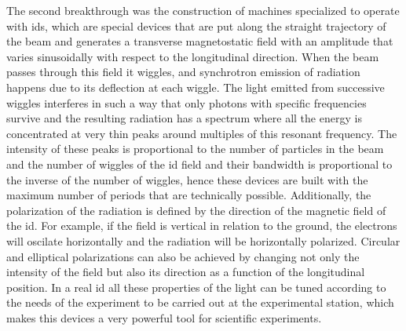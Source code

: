    The second breakthrough was the construction of machines specialized to operate with \gls{ids}, which are special devices that are put along the straight trajectory of the beam and generates a transverse magnetostatic field with an amplitude that varies sinusoidally with respect to the longitudinal direction. When the beam passes through this field it wiggles, and synchrotron emission of radiation happens due to its deflection at each wiggle. The light emitted from successive wiggles interferes in such a way that only photons with specific frequencies survive and the resulting radiation has a spectrum where all the energy is concentrated at very thin peaks around multiples of this resonant frequency. The intensity of these peaks is proportional to the number of particles in the beam and the number of wiggles of the \gls{id} field and their bandwidth is proportional to the inverse of the number of wiggles, hence these devices are built with the maximum number of periods that are technically possible. Additionally, the polarization of the radiation is defined by the direction of the magnetic field of the \gls{id}. For example, if the field is vertical in relation to the ground, the electrons will oscilate horizontally and the radiation will be horizontally polarized. Circular and elliptical polarizations can also be achieved by changing not only the intensity of the field but also its direction as a function of the longitudinal position. In a real \gls{id} all these properties of the light can be tuned according to the needs of the experiment to be carried out at the experimental station, which makes this devices a very powerful tool for scientific experiments.

